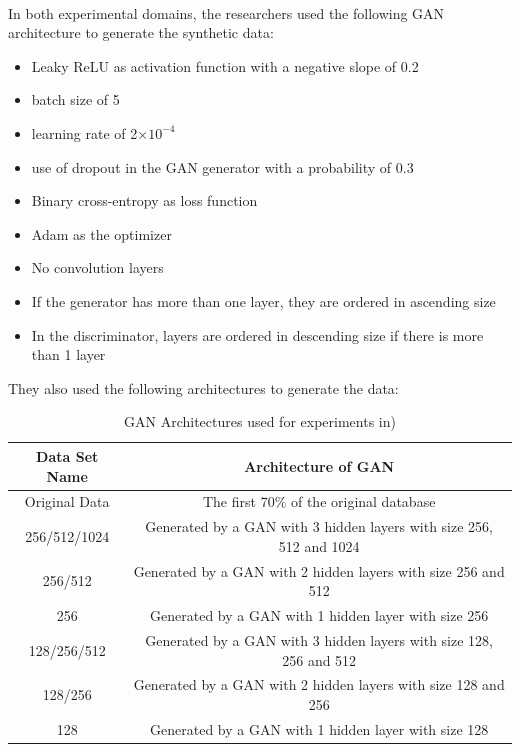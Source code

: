 \\
In both experimental domains, the researchers used the following GAN architecture to generate the synthetic data:
\begin{itemize}
    \item Leaky ReLU as activation function with a negative slope of 0.2
    \item batch size of 5
    \item learning rate of 2$\times10^{-4}$
    \item use of dropout in the GAN generator with a probability of 0.3
    \item Binary cross-entropy as loss function
    \item Adam as the optimizer
    \item No convolution layers
    \item If the generator has more than one layer, they are ordered in ascending size
    \item In the discriminator, layers are ordered in descending size if there is more than 1 layer
\end{itemize}\cite{litReviewGanDataAugmentation}
They also used the following architectures to generate the data:
\begin{table}[H]
    \centering
    \begin{tabular}{|c|c|}
    \hline
         Data Set Name
         & Architecture of GAN\\
         \hline
         Original Data & The first 70\% of the original database\\
         256/512/1024 & Generated by a GAN with 3 hidden layers with size 256, 512 and 1024\\
         256/512 & Generated by a GAN with 2 hidden layers with size 256 and 512\\
         256 & Generated by a GAN with 1 hidden layer with size 256\\
         128/256/512 & Generated by a GAN with 3 hidden layers with size 128, 256 and 512\\
         128/256 & Generated by a GAN with 2 hidden layers with size 128 and 256\\
         128 & Generated by a GAN with 1 hidden layer with size 128\\
         \hline
    \end{tabular}
    \caption{GAN Architectures used for experiments in\cite{litReviewGanDataAugmentation})}
    \label{tab:GAN architecture(Data Augmentation using GANs paper)}
\end{table}
